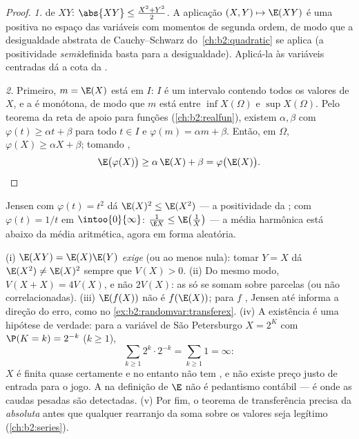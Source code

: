 \begin{proof}
\emph{1.}  de $XY$: $\abs{XY} \leq \frac{X^2 + Y^2}2$.
A aplicação $(X, Y) \mapsto \E(XY)$ é uma 
positiva no espaço das variáveis com momentos de segunda ordem, de modo que a desigualdade
abstrata de Cauchy--Schwarz do~\cref{ch:b2:quadratic} se aplica
(a positividade \emph{semi}definida basta para a desigualdade).
Aplicá-la às variáveis centradas dá a cota da .

\emph{2.} Primeiro, $m = \E(X)$ está em $I$: $I$ é um intervalo
contendo todos os valores de $X$, e a  é monótona, de modo que $m$
está entre $\inf X(\Omega)$ e $\sup X(\Omega)$. Pelo
teorema da reta de apoio para funções 
(\cref{ch:b2:realfun}), existem $\alpha, \beta$ com
$\varphi(t) \geq \alpha t + \beta$ para todo $t \in I$ e
$\varphi(m) = \alpha m + \beta$. Então,  em $\Omega$,
$\varphi(X) \geq \alpha X + \beta$; tomando ,
\[
\E\bigl(\varphi(X)\bigr) \geq \alpha\,\E(X) + \beta
= \varphi\bigl(\E(X)\bigr). \qedhere
\]
\end{proof}

\begin{example}
Jensen com $\varphi(t) = t^2$ dá $\E(X)^2 \leq \E(X^2)$ ---
a positividade da ; com $\varphi(t) = 1/t$ em
$\intoo{0}{\infty}$: $\frac{1}{\E X} \leq \E\bigl(\frac1X\bigr)$
--- a média harmônica está abaixo da média aritmética, agora em forma
aleatória.
\end{example}

\begin{remark}
(i) $\E(XY) = \E(X)\E(Y)$ \emph{exige}  (ou ao
menos  nula): tomar $Y = X$ dá $\E(X^2) \neq
\E(X)^2$ sempre que $V(X) > 0$. (ii) Do mesmo modo, $V(X + X) =
4V(X)$, e não $2V(X)$: as  só se somam sobre parcelas
 (ou não correlacionadas). (iii) $\E(f(X))$ não é
$f(\E(X))$; para $f$ , Jensen até informa a
direção do erro, como no
\cref{ex:b2:randomvar:transferex}. (iv) A existência é uma hipótese
de verdade: para a variável de São Petersburgo $X = 2^K$ com
$\P(K = k) = 2^{-k}$ ($k \geq 1$),
\[
\sum_{k\geq1}2^k\cdot2^{-k} = \sum_{k\geq1}1 = \infty :
\]
$X$ é finita quase certamente e no entanto não tem , e não existe
preço justo de entrada para o jogo. A  na
definição de $\E$ não é pedantismo contábil --- é
onde as caudas pesadas são detectadas. (v) Por fim, o teorema de
transferência precisa da  \emph{absoluta} antes que qualquer
rearranjo da soma sobre os valores seja legítimo
(\cref{ch:b2:series}).
\end{remark}



